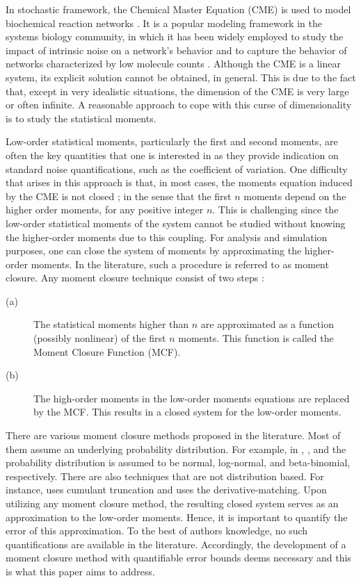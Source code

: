 \documentclass[letterpaper, 10 pt, conference]{ieeeconf}
\begin{document}
In stochastic framework, the Chemical Master Equation (CME) is used to model
biochemical reaction networks \cite{del2015biomolecular}. It is a popular
modeling framework in the systems biology community, in which it has been
widely employed to study the impact of intrinsic noise on a network's
behavior and to capture the behavior of networks characterized by low
molecule counts \cite{matheson1975stochastic}. Although the CME is a linear
system, its explicit solution cannot be obtained, in general. This is due to
the fact that, except in very idealistic situations, the dimension of the
CME is very large or often infinite. A reasonable approach to cope with this
curse of dimensionality is to study the statistical moments.

Low-order statistical moments, particularly the first and second moments,
are often the key quantities that one is interested in as they provide
indication on standard noise quantifications, such as the coefficient of
variation. One difficulty that arises in this approach is that, in most
cases, the moments equation induced by the CME is not closed \cite%
{sotiropoulos2011analytical}; in the sense that the first $n$ moments depend
on the higher order moments, for any positive integer $n$. This is
challenging since the low-order statistical moments of the system cannot be
studied without knowing the higher-order moments due to this coupling. For
analysis and simulation purposes, one can close the system of moments by
approximating the higher-order moments. In the literature, such a procedure
is referred to as moment closure. Any moment closure technique consist of
two steps \cite{sotiropoulos2011analytical}:

\begin{description}
\item[(a)] The statistical moments higher than $n$ are approximated as a
function (possibly nonlinear) of the first $n$ moments. This function is
called the Moment Closure Function (MCF).

\item[(b)] The high-order moments in the low-order moments equations are
replaced by the MCF. This results in a closed system for the low-order
moments.
\end{description}

There are various moment closure methods proposed in the literature. Most of
them assume an underlying probability distribution. For example, in \cite%
{whittle1957use}, \cite{singh2006lognormal}, and \cite{krishnarajah2005novel}
the probability distribution is assumed to be normal, log-normal, and
beta-binomial, respectively. There are also techniques that are not
distribution based. For instance, \cite{matis2002interacting} uses cumulant
truncation and \cite{singh2011approximate} uses the derivative-matching.
Upon utilizing any moment closure method, the resulting closed system serves
as an approximation to the low-order moments. Hence, it is important to
quantify the error of this approximation. To the best of authors knowledge,
no such quantifications are available in the literature. Accordingly, the
development of a moment closure method with quantifiable error bounds deems
necessary and this is what this paper aims to address.
\end{document}
